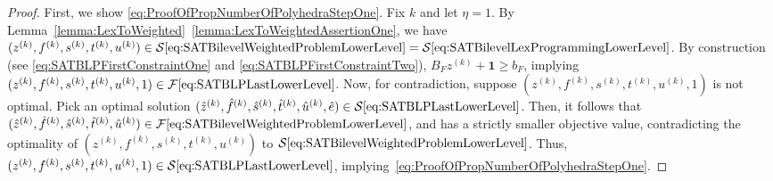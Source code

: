 \documentclass[runningheads,orivec]{llncs}
\newcommand{\MacroColor}[1]{#1}
\newcommand{\OneVector}{\mathbf{1}}
\newcommand{\OptSolSet}{\MacroColor{\mathcal{S}}}
\newcommand{\FeasSolSet}{\MacroColor{\mathcal{F}}}
\newcommand{\SATBooleanFormula}{\MacroColor{F}}
\newcommand{\ReformZ}{\MacroColor{z}}
\newcommand{\ReformAugFrac}{\MacroColor{f}}
\newcommand{\ReformPen}{\MacroColor{e}}
\newcommand{\LexLVarS}{\MacroColor{s}}
\newcommand{\LexLVarT}{\MacroColor{t}}
\newcommand{\LexLVarU}{\MacroColor{u}}
\begin{document}
\begin{appendix}
\begin{proof}
First, we show \ref{eq:ProofOfPropNumberOfPolyhedraStepOne}.
Fix $k$ and let $\eta = 1$.
By Lemma~\ref{lemma:LexToWeighted}~\ref{lemma:LexToWeightedAssertionOne}, we have $(\ReformZ^{(k)}, \ReformAugFrac^{(k)}, \LexLVarS^{(k)}, \LexLVarT^{(k)}, \LexLVarU^{(k)}) \in \OptSolSet\eqref{eq:SATBilevelWeightedProblemLowerLevel} = \OptSolSet\eqref{eq:SATBilevelLexProgrammingLowerLevel}$.
By construction (see \eqref{eq:SATBLPFirstConstraintOne} and \eqref{eq:SATBLPFirstConstraintTwo}), $B_{\SATBooleanFormula} \ReformZ^{(k)} +\OneVector \ge b_{\SATBooleanFormula}$, implying $(\ReformZ^{(k)}, \ReformAugFrac^{(k)}, \LexLVarS^{(k)}, \LexLVarT^{(k)}, \LexLVarU^{(k)}, 1) \in \FeasSolSet\eqref{eq:SATBLPLastLowerLevel}$.
Now, for contradiction, suppose $(\ReformZ^{(k)}, \ReformAugFrac^{(k)}, \LexLVarS^{(k)}, \LexLVarT^{(k)}, \LexLVarU^{(k)}, 1)$ is not optimal.
Pick an optimal solution $(\hat{\ReformZ}^{(k)}, \hat{\ReformAugFrac}^{(k)}, \hat{\LexLVarS}^{(k)}, \hat{\LexLVarT}^{(k)}, \hat{\LexLVarU}^{(k)}, \hat{\ReformPen}) \in \OptSolSet\eqref{eq:SATBLPLastLowerLevel}$.
Then, it follows that $(\hat{\ReformZ}^{(k)}, \hat{\ReformAugFrac}^{(k)}, \hat{\LexLVarS}^{(k)}, \hat{\LexLVarT}^{(k)}, \hat{\LexLVarU}^{(k)}) \in \FeasSolSet\eqref{eq:SATBilevelWeightedProblemLowerLevel}$, and has a strictly smaller objective value, contradicting the optimality of $(\ReformZ^{(k)}, \ReformAugFrac^{(k)}, \LexLVarS^{(k)}, \LexLVarT^{(k)}, \LexLVarU^{(k)})$ to $\OptSolSet\eqref{eq:SATBilevelWeightedProblemLowerLevel}$.
Thus, $(\ReformZ^{(k)}, \ReformAugFrac^{(k)}, \LexLVarS^{(k)}, \LexLVarT^{(k)}, \LexLVarU^{(k)}, 1) \in \OptSolSet\eqref{eq:SATBLPLastLowerLevel}$, implying~\ref{eq:ProofOfPropNumberOfPolyhedraStepOne}.


\end{proof}
\end{appendix}
\end{document}
